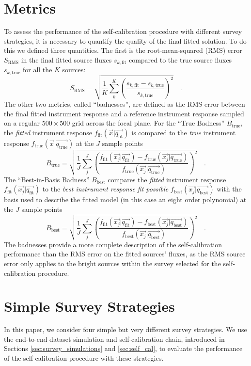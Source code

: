 \documentclass[manuscript]{aastex}
\newcommand{\true}{\text{true}}
\newcommand{\fit}{\text{fit}}
\newcommand{\basis}{\text{best}}
\begin{document}
\section{Metrics}
\label{sec:metrics}
To assess the performance of the self-calibration procedure with different survey strategies, it is necessary to quantify the quality of the final fitted solution. To do this we defined three quantities. The first is the root-mean-squared (RMS) error $S_\text{RMS}$ in the final fitted source fluxes $s_{k,\fit}$ compared to the true source fluxes $s_{k,\true}$ for all the $K$ sources:
\begin{equation}
S_\text{RMS} = \sqrt{\dfrac{1}{K} \sum_k^K \left( \dfrac{s_{k,\fit} - s_{k,\true}}{s_{k,\true}} \right)^2}   \quad .
\end{equation}
The other two metrics, called ``badnesses'', are defined as the RMS error between the final fitted instrument response and a reference instrument response sampled on a regular $500 \times 500$ grid across the focal plane. For the ``True Badness'' $B_\true$, the \textit{fitted} instrument response $f_\fit(\vec{x} | \vec{q_\fit})$ is compared to the \textit{true} instrument response $f_\true(\vec{x} | \vec{q_\true})$ at the $J$ sample points  
\begin{equation}
B_\true = \sqrt{\dfrac{1}{J} \sum_j^J \left(\dfrac{f_\fit(\vec{x_j} | \vec{q_\fit}) - f_\true(\vec{x_j} | \vec{q_\true})}{f_\true(\vec{x_j} | \vec{q_\true})}\right)^2}   \quad .
\end{equation}
The ``Best-in-Basis Badness'' $B_\basis$ compares the \textit{fitted} instrument response $f_\fit(\vec{x_j} | \vec{q_\fit})$ to the \textit{best instrument response fit possible} $f_\basis(\vec{x_j} | \vec{q_\basis})$ with the basis used to describe the fitted model (in this case an eight order polynomial) at the $J$ sample points
\begin{equation}
B_\basis = \sqrt{\dfrac{1}{J} \sum_j^J \left( \dfrac{f_\fit(\vec{x_j} | \vec{q_\fit}) - f_\basis(\vec{x_j} | \vec{q_\basis})}{f_\basis(\vec{x_j} | \vec{q_\basis})} \right)^2}   \quad .
\end{equation}
The badnesses provide a more complete description of the self-calibration performance than the RMS error on the fitted sources' fluxes, as the RMS source error only applies to the bright sources within the survey selected for the self-calibration procedure.

\section{Simple Survey Strategies}
\label{sec:simple_surveys}
In this paper, we consider four simple but very different survey strategies. We use the end-to-end dataset simulation and self-calibration chain, introduced in Sections \ref{sec:survey_simulations} and \ref{sec:self_cal}, to evaluate the performance of the self-calibration procedure with these strategies. 
\end{document}
